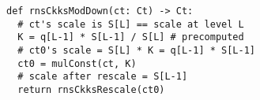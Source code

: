 \begin{figure}
\begin{lstlisting}[label=lst:mod_down,caption={
  Implementation of precise mod-down in RNS-CKKS between levels $L$ and $L-1$.
}]
def rnsCkksModDown(ct: Ct) -> Ct:
  # ct's scale is S[L] == scale at level L
  K = q[L-1] * S[L-1] / S[L] # precomputed
  # ct0's scale = S[L] * K = q[L-1] * S[L-1]
  ct0 = mulConst(ct, K)
  # scale after rescale = S[L-1]
  return rnsCkksRescale(ct0)
\end{lstlisting}
\vspace{-0.1in}
\end{figure}
